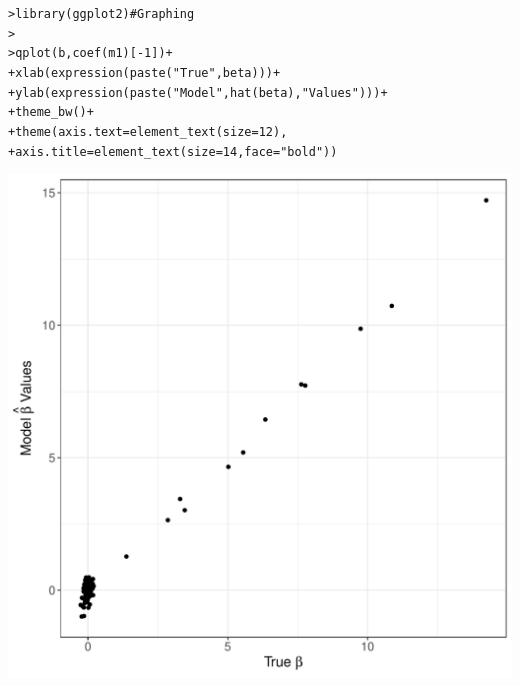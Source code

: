 \documentclass[12pt]{article}\usepackage[]{graphicx}\usepackage[]{color}
\makeatletter
\def\maxwidth{ %
  \ifdim\Gin@nat@width>\linewidth
    \linewidth
  \else
    \Gin@nat@width
  \fi
}
\newcommand{\hlnum}[1]{\textcolor[rgb]{0.82,0.78,0.62}{#1}}%
\newcommand{\hlstr}[1]{\textcolor[rgb]{0.82,0.78,0.62}{#1}}%
\newcommand{\hlcom}[1]{\textcolor[rgb]{0.404,0.408,0.42}{#1}}%
\newcommand{\hlopt}[1]{\textcolor[rgb]{0.882,0.878,0.898}{#1}}%
\newcommand{\hlstd}[1]{\textcolor[rgb]{0.882,0.878,0.898}{#1}}%
\newcommand{\hlkwc}[1]{\textcolor[rgb]{0.812,0.522,0.388}{#1}}%
\newcommand{\hlkwd}[1]{\textcolor[rgb]{0.733,0.388,0.812}{#1}}%
\newenvironment{kframe}{%
 \def\at@end@of@kframe{}%
 \ifinner\ifhmode%
  \def\at@end@of@kframe{\end{minipage}}%
  \begin{minipage}{\columnwidth}%
 \fi\fi%
 \def\FrameCommand##1{\hskip\@totalleftmargin \hskip-\fboxsep
 \colorbox{shadecolor}{##1}\hskip-\fboxsep
     \hskip-\linewidth \hskip-\@totalleftmargin \hskip\columnwidth}%
 \MakeFramed {\advance\hsize-\width
   \@totalleftmargin\z@ \linewidth\hsize
   \@setminipage}}%
 {\par\unskip\endMakeFramed%
 \at@end@of@kframe}
\newenvironment{knitrout}{}{} %
\makeatother
\begin{document}
\begin{flushleft}
\begin{center}
\begin{knitrout}
\color{fgcolor}\begin{kframe}
\begin{alltt}
\hlstd{> }\hlkwd{library}\hlstd{(ggplot2)} \hlcom{# Graphing}
\hlstd{> }
\hlstd{> }\hlkwd{qplot}\hlstd{(b,} \hlkwd{coef}\hlstd{(m1)[}\hlopt{-}\hlnum{1}\hlstd{])}\hlopt{+}
\hlstd{+ }     \hlkwd{xlab}\hlstd{(} \hlkwd{expression}\hlstd{(}\hlkwd{paste}\hlstd{(}\hlstr{"True "} \hlstd{, beta)))}\hlopt{+}
\hlstd{+ }     \hlkwd{ylab}\hlstd{(} \hlkwd{expression}\hlstd{(}\hlkwd{paste}\hlstd{(}\hlstr{"Model "} \hlstd{,} \hlkwd{hat}\hlstd{(beta),} \hlstr{" Values"}\hlstd{)))}\hlopt{+}
\hlstd{+ }     \hlkwd{theme_bw}\hlstd{()}\hlopt{+}
\hlstd{+ }     \hlkwd{theme}\hlstd{(}\hlkwc{axis.text}\hlstd{=}\hlkwd{element_text}\hlstd{(}\hlkwc{size}\hlstd{=}\hlnum{12}\hlstd{),}
\hlstd{+ }           \hlkwc{axis.title}\hlstd{=}\hlkwd{element_text}\hlstd{(}\hlkwc{size}\hlstd{=}\hlnum{14}\hlstd{,}\hlkwc{face}\hlstd{=}\hlstr{"bold"}\hlstd{))}
\end{alltt}
\end{kframe}
\includegraphics[width=\maxwidth]{figure/betabetatestPenRegress1-1} 

\end{knitrout}
\end{center}


\end{flushleft}
\end{document}
